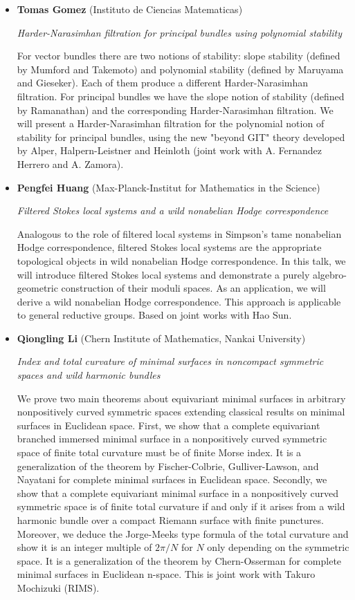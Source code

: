 \documentclass{article}
\begin{document}
\begin{itemize}
\item {\bf Tomas Gomez} (Instituto de Ciencias Matematicas)

{\it Harder-Narasimhan filtration for principal bundles using polynomial
stability}

For vector bundles there are two notions of stability: slope
stability (defined by Mumford and Takemoto) and polynomial stability
(defined by Maruyama and Gieseker). Each of them produce a different
Harder-Narasimhan filtration. For principal bundles we have the slope
notion of stability (defined by Ramanathan) and the corresponding
Harder-Narasimhan filtration. We will present a Harder-Narasimhan
filtration for the polynomial notion of stability for principal bundles,
using the new "beyond GIT" theory developed by Alper, Halpern-Leistner and
Heinloth (joint work with A. Fernandez Herrero and A. Zamora).


\item {\bf Pengfei Huang} (Max-Planck-Institut for Mathematics in the Science)

{\it Filtered Stokes local systems and a wild nonabelian Hodge correspondence}

Analogous to the role of filtered local systems in Simpson's tame nonabelian Hodge correspondence, filtered Stokes local systems are the appropriate topological objects in wild nonabelian Hodge correspondence. In this talk, we will introduce filtered Stokes local systems and demonstrate a purely algebro-geometric construction of their moduli spaces. As an application, we will derive a wild nonabelian Hodge correspondence. This approach is applicable to general reductive groups. Based on joint works with Hao Sun.

\item {\bf Qiongling Li} (Chern Institute of Mathematics, Nankai University)

{\it  Index and total curvature of minimal surfaces in noncompact symmetric spaces and wild harmonic bundles}

We prove two main theorems about equivariant minimal surfaces in arbitrary nonpositively curved symmetric spaces extending classical results on minimal surfaces in Euclidean space. First, we show that a complete equivariant branched immersed minimal surface in a nonpositively curved symmetric space of finite total curvature must be of finite Morse index. It is a generalization of the theorem by Fischer-Colbrie, Gulliver-Lawson, and Nayatani for complete minimal surfaces in Euclidean space. Secondly, we show that a complete equivariant minimal surface in a nonpositively curved symmetric space is of finite total curvature if and only if it arises from a wild harmonic bundle over a compact Riemann surface with finite punctures. Moreover, we deduce the Jorge-Meeks type formula of the total curvature and show it is an integer multiple of $2\pi/N$ for $N$ only depending on the symmetric space. It is a generalization of the theorem by Chern-Osserman for complete minimal surfaces in Euclidean n-space. This is joint work with Takuro Mochizuki (RIMS).



\end{itemize}
\end{document}
